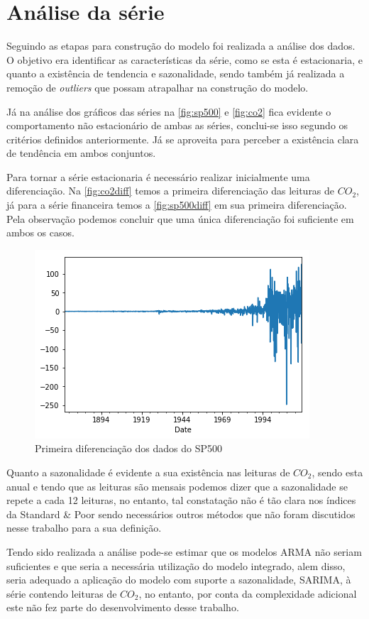 \documentclass[
    12pt,
    oneside,
    a4paper,
    english,
    brazil
]{abntex2}
\begin{document}
\section{Análise da série}

Seguindo as etapas para construção do modelo foi realizada a análise dos dados.
O  objetivo  era identificar  as  características  da  série,  como se  esta  é
estacionaria, e quanto  a existência de tendencia e  sazonalidade, sendo também
já realizada a remoção de \textit{outliers} que possam atrapalhar na construção
do modelo.

Já   na   análise   dos   gráficos  das   séries   na   \autoref{fig:sp500}   e
\autoref{fig:co2} fica  evidente o comportamento  não estacionário de  ambas as
séries, conclui-se  isso segundo  os critérios  definidos anteriormente.  Já se
aproveita para perceber a existência clara de tendência em ambos conjuntos.

Para  tornar  a  série  estacionaria é  necessário  realizar  inicialmente  uma
diferenciação.  Na \autoref{fig:co2diff}  temos  a  primeira diferenciação  das
leituras de $CO_2$, já para  a série financeira temos a \autoref{fig:sp500diff}
em sua primeira  diferenciação. Pela observação podemos concluir  que uma única
diferenciação foi suficiente em ambos os casos.

\begin{figure}[ht]
    \centering
    \caption{Primeira diferenciação dos dados do SP500}\label{fig:sp500diff}
    \includegraphics[width=.5\linewidth]{images/sp500diff.png}
\end{figure}

Quanto a sazonalidade é evidente a sua existência nas leituras de $CO_2$, sendo
esta anual e tendo que as leituras são mensais podemos dizer que a sazonalidade
se repete a cada  12 leituras, no entanto, tal constatação não  é tão clara nos
índices da  Standard \&  Poor sendo  necessários outros  métodos que  não foram
discutidos nesse trabalho para a sua definição.

Tendo sido realizada  a análise pode-se estimar que os  modelos ARMA não seriam
suficientes  e que  seria a  necessária  utilização do  modelo integrado,  alem
disso, seria adequado a aplicação do modelo com suporte a sazonalidade, SARIMA,
à série  contendo leituras  de $CO_2$,  no entanto,  por conta  da complexidade
adicional este não fez parte do desenvolvimento desse trabalho.
\end{document}
